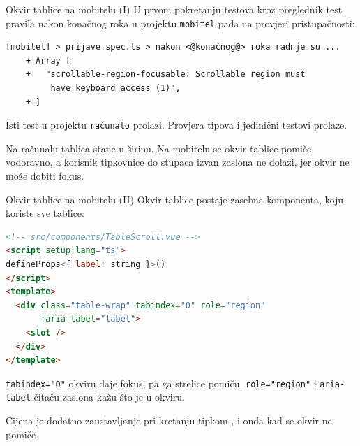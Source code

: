 \begin{frame}[fragile]{Okvir tablice na mobitelu (I)}
U prvom pokretanju testova kroz preglednik test pravila nakon konačnog roka u projektu \texttt{mobitel} pada na provjeri pristupačnosti:

\begin{lstlisting}[keepspaces=true]
[mobitel] > prijave.spec.ts > nakon <@konačnog@> roka radnje su ...
    + Array [
    +   "scrollable-region-focusable: Scrollable region must
         have keyboard access (1)",
    + ]
\end{lstlisting}

\vspace{0.4em}
Isti test u projektu \texttt{računalo} prolazi. Provjera tipova i jedinični testovi prolaze.

\vspace{0.4em}
Na računalu tablica stane u širinu. Na mobitelu se okvir tablice pomiče vodoravno, a korisnik tipkovnice do stupaca izvan zaslona ne dolazi, jer okvir ne može dobiti fokus.
\end{frame}

\begin{frame}[fragile]{Okvir tablice na mobitelu (II)}
Okvir tablice postaje zasebna komponenta, koju koriste sve tablice:

\begin{lstlisting}[language=html, morecomment={[s]{<!--}{-->}}]
<!-- src/components/TableScroll.vue -->
<script setup lang="ts">
defineProps<{ label: string }>()
</script>
<template>
  <div class="table-wrap" tabindex="0" role="region"
       :aria-label="label">
    <slot />
  </div>
</template>
\end{lstlisting}

\vspace{0.3em}
\texttt{tabindex="0"} okviru daje fokus, pa ga strelice pomiču. \texttt{role="region"} i \texttt{aria-label} čitaču zaslona kažu što je u okviru.

\vspace{0.3em}
Cijena je dodatno zaustavljanje pri kretanju tipkom , i onda kad se okvir ne pomiče.
\end{frame}

